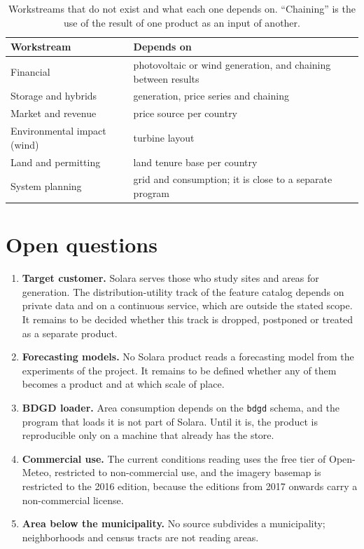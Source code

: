 \documentclass[10pt,a4paper,oneside]{article}
\begin{document}
\begin{table}[H]
\caption{Workstreams that do not exist and what each one depends on.
\enquote{Chaining} is the use of the result of one product as an input of
another.}
\begin{tabularx}{\linewidth}{L{48mm} Y}
\toprule
\textbf{Workstream} & \textbf{Depends on} \\
\midrule
Financial & photovoltaic or wind generation, and chaining between results \\
Storage and hybrids & generation, price series and chaining \\
Market and revenue & price source per country \\
Environmental impact (wind) & turbine layout \\
Land and permitting & land tenure base per country \\
System planning & grid and consumption; it is close to a separate program \\
\bottomrule
\end{tabularx}
\end{table}

\section{Open questions}
\label{sec:abertas}

\begin{enumerate}
  \item \textbf{Target customer.} Solara serves those who study sites and
    areas for generation. The distribution-utility track of the feature
    catalog depends on private data and on a continuous service, which are
    outside the stated scope. It remains to be decided whether this track is
    dropped, postponed or treated as a separate product.
  \item \textbf{Forecasting models.} No Solara product reads a forecasting
    model from the experiments of the project. It remains to be defined
    whether any of them becomes a product and at which scale of place.
  \item \textbf{BDGD loader.} Area consumption depends on the \texttt{bdgd}
    schema, and the program that loads it is not part of Solara. Until it
    is, the product is reproducible only on a machine that already has the
    store.
  \item \textbf{Commercial use.} The current conditions reading uses the
    free tier of Open-Meteo, restricted to non-commercial use, and the
    imagery basemap is restricted to the 2016 edition, because the editions
    from 2017 onwards carry a non-commercial license.
  \item \textbf{Area below the municipality.} No source subdivides a
    municipality; neighborhoods and census tracts are not reading areas.
\end{enumerate}
\end{document}
